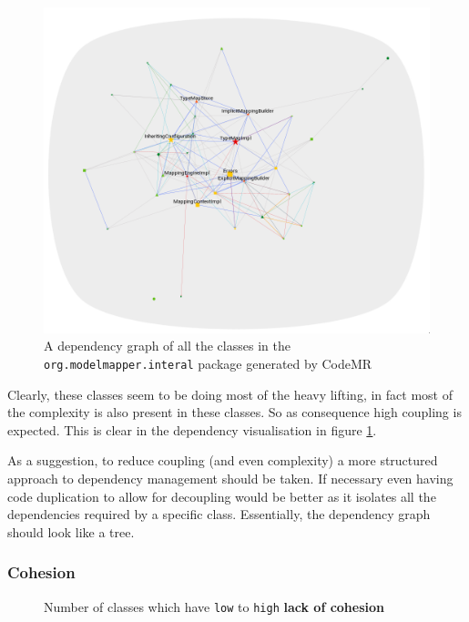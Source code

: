 \documentclass[12pt]{article}
\begin{document}
\begin{figure}[H]
    \centering
    \includegraphics[width=16cm]{images/internal-package-coupling.png}
    \caption{A dependency graph of all the classes in the
    \texttt{org.modelmapper.interal} package generated by
    CodeMR}
    \label{internal-package-coupling}
\end{figure}

Clearly, these classes seem to be doing most of the heavy
lifting, in fact most of the complexity is also present in these
classes. So as consequence high coupling is expected. This is
clear in the dependency visualisation in figure
\ref{internal-package-coupling}.

As a suggestion, to reduce coupling (and even complexity) a more
structured approach to dependency management should be taken. If
necessary even having code duplication to allow for decoupling
would be better as it isolates all the dependencies required by
a specific class. Essentially, the dependency graph should look
like a tree. 

\subsubsection{Cohesion}

\begin{figure}[H]
    \centering
    \caption{Number of classes which have \texttt{low} to
    \texttt{high} \textbf{lack of cohesion}}
    \label{cohesion-diag}
\end{figure}
\end{document}
